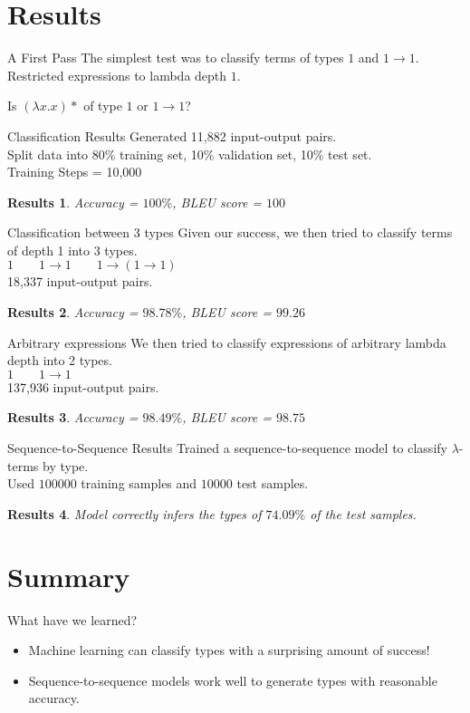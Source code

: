 \documentclass[17pt]{beamer}
\newtheorem{res}{Results}
\begin{document}
\section{Results}

\begin{frame}{A First Pass}
  The simplest test was to classify terms of types $1$ and $1 \to 1$.\\
  Restricted expressions to lambda depth $1$.

  \begin{example}
    Is $(\lambda x. x)*$ of type $1$ or $1 \to 1$?
  \end{example}
\end{frame}

\begin{frame}{Classification Results}
  Generated 11,882 input-output pairs.\\
  Split data into 80\% training set, 10\% validation set, 10\% test set.\\
  Training Steps = 10,000
  \begin{res}
  Accuracy = $100\%$, BLEU score = $100$
  \end{res}
\end{frame}

\begin{frame}{Classification between 3 types}
  Given our success, we then tried to classify terms of depth 1 into
  3 types.\\
  $1 \qquad 1 \to 1 \qquad 1 \to (1 \to 1)$\\
  18,337 input-output pairs.
  \begin{res}
  Accuracy = $98.78\%$, BLEU score = $99.26$
  \end{res}
\end{frame}

\begin{frame}{Arbitrary expressions}
  We then tried to classify expressions of arbitrary lambda depth
  into 2 types.\\
  $1 \qquad 1 \to 1$\\
  137,936 input-output pairs.
  \begin{res}
  Accuracy = $98.49\%$, BLEU score = $98.75$
  \end{res}
\end{frame}

\begin{frame}{Sequence-to-Sequence Results}
  Trained a sequence-to-sequence model to classify $\lambda$-terms by
  type.\\
  Used $100000$ training samples and $10000$ test samples.\\
  \begin{res}
    Model correctly infers the types of $74.09\%$ of the test samples.
  \end{res}
\end{frame}

\section{Summary}

\begin{frame}{What have we learned?}
  \begin{itemize}
  \item Machine learning can classify types with a surprising amount of
    success!
  \item Sequence-to-sequence models work well to generate types with
    reasonable accuracy.
  \end{itemize}
\end{frame}
\end{document}
